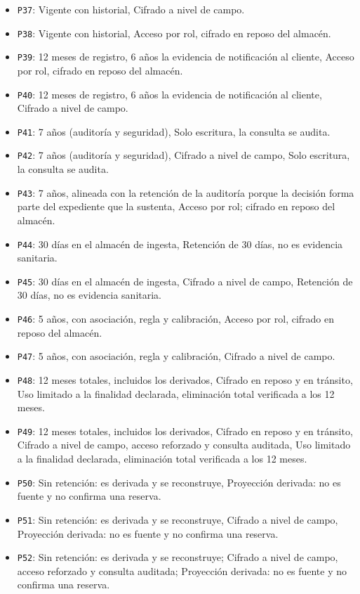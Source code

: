 \begin{itemize}
\item \texttt{P37}: Vigente con historial, Cifrado a nivel de campo.
\item \texttt{P38}: Vigente con historial, Acceso por rol, cifrado en reposo del almacén.
\item \texttt{P39}: 12 meses de registro, 6 años la evidencia de notificación al cliente, Acceso por rol, cifrado en reposo del almacén.
\item \texttt{P40}: 12 meses de registro, 6 años la evidencia de notificación al cliente, Cifrado a nivel de campo.
\item \texttt{P41}: 7 años (auditoría y seguridad), Solo escritura, la consulta se audita.
\item \texttt{P42}: 7 años (auditoría y seguridad), Cifrado a nivel de campo, Solo escritura, la consulta se audita.
\item \texttt{P43}: 7 años, alineada con la retención de la auditoría porque la decisión forma parte del expediente que la sustenta, Acceso por rol; cifrado en reposo del almacén.
\item \texttt{P44}: 30 días en el almacén de ingesta, Retención de 30 días, no es evidencia sanitaria.
\item \texttt{P45}: 30 días en el almacén de ingesta, Cifrado a nivel de campo, Retención de 30 días, no es evidencia sanitaria.
\item \texttt{P46}: 5 años, con asociación, regla y calibración, Acceso por rol, cifrado en reposo del almacén.
\item \texttt{P47}: 5 años, con asociación, regla y calibración, Cifrado a nivel de campo.
\item \texttt{P48}: 12 meses totales, incluidos los derivados, Cifrado en reposo y en tránsito, Uso limitado a la finalidad declarada, eliminación total verificada a los 12 meses.
\item \texttt{P49}: 12 meses totales, incluidos los derivados, Cifrado en reposo y en tránsito, Cifrado a nivel de campo, acceso reforzado y consulta auditada, Uso limitado a la finalidad declarada, eliminación total verificada a los 12 meses.
\item \texttt{P50}: Sin retención: es derivada y se reconstruye, Proyección derivada: no es fuente y no confirma una reserva.
\item \texttt{P51}: Sin retención: es derivada y se reconstruye, Cifrado a nivel de campo, Proyección derivada: no es fuente y no confirma una reserva.
\item \texttt{P52}: Sin retención: es derivada y se reconstruye; Cifrado a nivel de campo, acceso reforzado y consulta auditada; Proyección derivada: no es fuente y no confirma una reserva.

\end{itemize}
